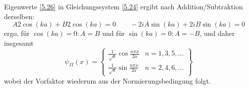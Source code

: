 Eigenwerte \eqref{5.26} in Gleichungssystem \eqref{5.24} ergibt nach Addition/Subtraktion derselben:
\begin{equation*}
A 2 \cos(ka) + B 2 \cos(ka) = 0 \qquad - 2 i A \sin(ka) + 2 i B \sin(ka) = 0
\end{equation*}
ergo, für $ \cos(ka) = 0: A = B $ und für $ \sin(ka) = 0: A = - B $, und daher insgesamt
\begin{equation}
\psi_{II}(x) = \left\{ \begin{array}{ll}
\frac{1}{\sqrt{a}} \cos \frac{n \pi x}{2 a} & n = 1,3,5,\dots \\
\frac{1}{\sqrt{a}} \sin \frac{n \pi x}{2 a} & n = 2,4,6,\dots
\end{array} \right\}
\label{5.27}
\end{equation}
wobei der Vorfaktor wiederum aus der Normierungsbedingung folgt.